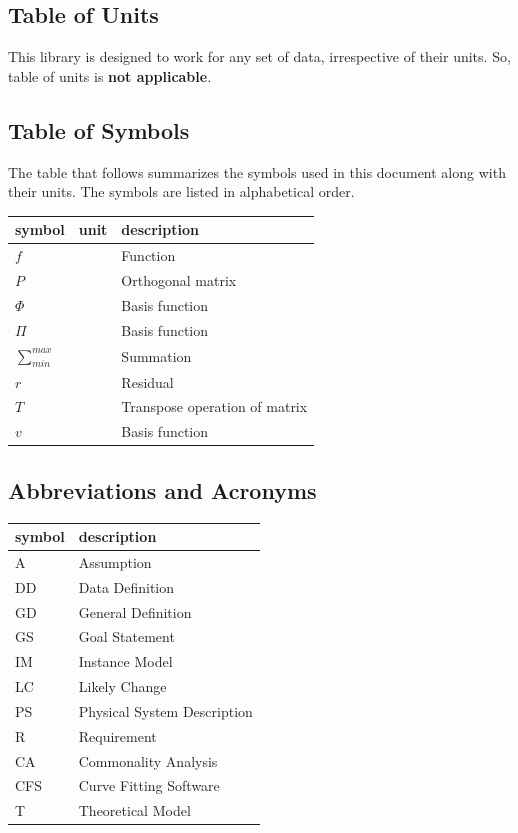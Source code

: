 \documentclass[12pt]{article}
\newcommand{\famname}{CFS} %
\begin{document}
\subsection{Table of Units}
This library is designed to work for any set of data, irrespective of their units. So, table of units is \textbf{not applicable}. 



\subsection{Table of Symbols}

The table that follows summarizes the symbols used in this document along with
their units. The symbols are listed in alphabetical order.

\renewcommand{\arraystretch}{1.2}
\noindent \begin{longtable*}{l l p{12cm}} \toprule
\textbf{symbol} & \textbf{unit} & \textbf{description}\\
\midrule 
$f$ & & Function\\
$P$ & & Orthogonal matrix\\
$\Phi$ & & Basis function\\
$\Pi$ & & Basis function\\
$\sum_{min}^{max}$& & Summation \\ 
$r$ & & Residual\\
$T$ & & Transpose operation of matrix\\
$v$ & & Basis function\\
\bottomrule
\end{longtable*}


\subsection{Abbreviations and Acronyms}

\renewcommand{\arraystretch}{1.2}
\begin{tabular}{l l} 
  \toprule		
  \textbf{symbol} & \textbf{description}\\
  \midrule 
  A & Assumption\\
  DD & Data Definition\\
  GD & General Definition\\
  GS & Goal Statement\\
  IM & Instance Model\\
  LC & Likely Change\\
  PS & Physical System Description\\
  R & Requirement\\
  CA & Commonality Analysis\\
  \famname & Curve Fitting Software\\
  T & Theoretical Model\\
  \bottomrule
\end{tabular}\\
\end{document}
